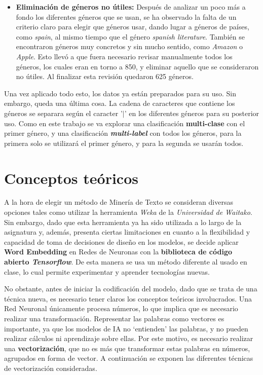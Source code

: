 \documentclass[12pt,a4paper, xcolor=table]{article}
\begin{document}
\begin{itemize}
            \item \textbf{Eliminación de géneros no útiles:} Después de analizar un poco más a fondo los diferentes géneros que se usan, se ha observado la falta de un criterio claro para elegir que géneros usar, dando lugar a géneros de países, como \textit{spain}, al mismo tiempo que el género \textit{spanish literature}. También se encontraron géneros muy concretos y sin mucho sentido, como \textit{Amazon} o \textit{Apple}. Esto llevó a que fuera necesario revisar manualmente todos los géneros, los cuales eran en torno a 850, y eliminar aquello que se consideraron no útiles. Al finalizar esta revisión quedaron 625 géneros.
        \end{itemize}

    \vspace{3mm}

    Una vez aplicado todo esto, los datos ya están preparados para su uso. Sin embargo, queda una última cosa. La cadena de caracteres que contiene los géneros se separara según el caracter '$|$' en los diferentes géneros para su posterior uso. Como en este trabajo se va explorar una clasificación \textbf{multi-clase} con el primer género, y una clasificación \textit{\textbf{multi-label}} con todos los géneros, para la primera solo se utilizará el primer género, y para la segunda se usarán todos.

\newpage

\section{Conceptos teóricos}
A la hora de elegir un método de Minería de Texto se consideran diversas opciones tales como utilizar la herramienta \textit{Weka} de la \textit{Universidad de Waitako}. Sin embargo, dado que esta herramienta ya ha sido utilizada a lo largo de la asignatura y, además, presenta ciertas limitaciones en cuanto a la flexibilidad y capacidad de toma de decisiones de diseño en los modelos, se decide aplicar \textbf{Word Embedding} en Redes de Neuronas con la \textbf{biblioteca de código abierto \textit{Tensorflow}}. De esta manera se usa un método diferente al usado en clase, lo cual permite experimentar y aprender tecnologías nuevas.

\vspace{3mm}

No obstante, antes de iniciar la codificación del modelo, dado que se trata de una técnica nueva, es necesario tener claros los conceptos teóricos involucrados. Una Red Neuronal únicamente procesa números, lo que implica que es necesario realizar una transformación. Representar las palabras como vectores es importante, ya que los modelos de IA no ‘entienden’ las palabras, y no pueden realizar cálculos ni aprendizaje sobre ellas. Por este motivo, es necesario realizar una \textbf{vectorización}, que no es más que transformar estas palabras en números, agrupados en forma de vector. A continuación se exponen las diferentes técnicas de vectorización consideradas.
\end{document}
